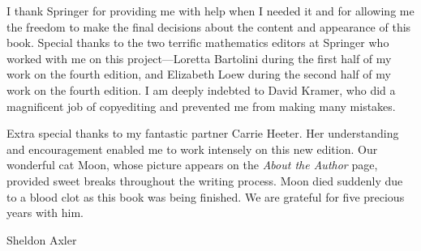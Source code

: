 I thank Springer for providing me with help when I needed it and for allowing
me the freedom to make the final decisions about the content and appearance of
this book. Special thanks to the two terrific mathematics editors at Springer
who worked with me on this project---Loretta Bartolini during the first half of
my work on the fourth edition, and Elizabeth Loew during the second half of my
work on the fourth edition. I am deeply indebted to David Kramer, who did a
magnificent job of copyediting and prevented me from making many mistakes.

Extra special thanks to my fantastic partner Carrie Heeter. Her understanding
and encouragement enabled me to work intensely on this new edition. Our
wonderful cat Moon, whose picture appears on the \emph{About the Author} page,
provided sweet breaks throughout the writing process. Moon died suddenly due to
a blood clot as this book was being finished. We are grateful for five precious
years with him.

\begin{flushright}
Sheldon Axler
\end{flushright}

